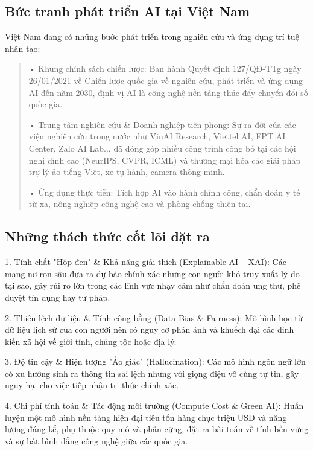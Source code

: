 \subsection{Bức tranh phát triển AI tại Việt Nam}\label{bux1ee9c-tranh-phuxe1t-triux1ec3n-ai-tux1ea1i-viux1ec7t-nam}

Việt Nam đang có những bước phát triển trong nghiên cứu và ứng dụng trí
tuệ nhân tạo:

\begin{quote}
• Khung chính sách chiến lược: Ban hành Quyết định 127/QĐ-TTg ngày
26/01/2021 về Chiến lược quốc gia về nghiên cứu, phát triển và ứng dụng
AI đến năm 2030, định vị AI là công nghệ nền tảng thúc đẩy chuyển đổi số
quốc gia.

• Trung tâm nghiên cứu \& Doanh nghiệp tiên phong: Sự ra đời của các
viện nghiên cứu trong nước như VinAI Research, Viettel AI, FPT AI
Center, Zalo AI Lab... đã đóng góp nhiều công trình công bố tại các hội
nghị đỉnh cao (NeurIPS, CVPR, ICML) và thương mại hóa các giải pháp trợ
lý ảo tiếng Việt, xe tự hành, camera thông minh.

• Ứng dụng thực tiễn: Tích hợp AI vào hành chính công, chẩn đoán y tế từ
xa, nông nghiệp công nghệ cao và phòng chống thiên tai.
\end{quote}

\subsection{Những thách thức cốt lõi đặt ra}\label{nhux1eefng-thuxe1ch-thux1ee9c-cux1ed1t-luxf5i-ux111ux1eb7t-ra}

1. Tính chất "Hộp đen" \& Khả năng giải thích (Explainable AI -- XAI):
Các mạng nơ-ron sâu đưa ra dự báo chính xác nhưng con người khó truy
xuất lý do tại sao, gây rủi ro lớn trong các lĩnh vực nhạy cảm như chẩn
đoán ung thư, phê duyệt tín dụng hay tư pháp.

2. Thiên lệch dữ liệu \& Tính công bằng (Data Bias \& Fairness): Mô hình
học từ dữ liệu lịch sử của con người nên có nguy cơ phản ánh và khuếch
đại các định kiến xã hội về giới tính, chủng tộc hoặc địa lý.

3. Độ tin cậy \& Hiện tượng "Ảo giác" (Hallucination): Các mô hình ngôn
ngữ lớn có xu hướng sinh ra thông tin sai lệch nhưng với giọng điệu vô
cùng tự tin, gây nguy hại cho việc tiếp nhận tri thức chính xác.

4. Chi phí tính toán \& Tác động môi trường (Compute Cost \& Green AI):
Huấn luyện một mô hình nền tảng hiện đại tiêu tốn hàng chục triệu USD và
năng lượng đáng kể, phụ thuộc quy mô và phần cứng, đặt ra bài toán về
tính bền vững và sự bất bình đẳng công nghệ giữa các quốc gia.

